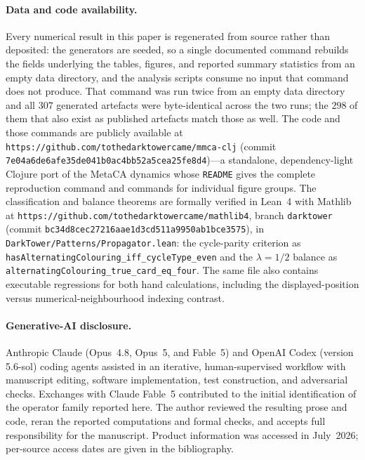 \documentclass[man,12pt,floatsintext,donotrepeattitle]{apa7}
\begin{document}
\paragraph{Data and code availability.} Every numerical result in this paper is
regenerated from source rather than deposited: the generators are seeded, so a
single documented command rebuilds the fields underlying the tables, figures,
and reported summary statistics from an empty data directory, and the analysis
scripts consume no input that command does not produce. That command was run
twice from an empty data directory and all $307$ generated artefacts were
byte-identical across the two runs; the $298$ of them that also exist as
published artefacts match those as well. The code and those
commands are publicly available at
\texttt{https://github.com/tothedarktowercame/mmca-clj} (commit
\texttt{7e04a6de6afe35de041b0ac4bb52a5cea25fe8d4})---a standalone,
dependency-light Clojure port of the MetaCA dynamics whose \texttt{README} gives
the complete reproduction command and commands for individual figure groups.
The classification and balance theorems are
formally verified in Lean~4 with Mathlib at
\texttt{https://github.com/tothedarktowercame/mathlib4}, branch \texttt{darktower}
(commit \texttt{bc34d8cec27216aae1d3cd511a9950ab1bce3575}), in
\texttt{DarkTower/Patterns/Propagator.lean}: the cycle-parity criterion as
\texttt{hasAlternatingColouring\_iff\_cycleType\_even} and the $\lambda = 1/2$
balance as \texttt{alternatingColouring\_true\_card\_eq\_four}. The same file
also contains executable regressions for both hand calculations, including the
displayed-position versus numerical-neighbourhood indexing contrast.

\paragraph{Generative-AI disclosure.} Anthropic Claude (Opus~4.8, Opus~5, and
Fable~5) and OpenAI Codex (version 5.6-sol) coding agents
\parencite{anthropic_claude,anthropic_fable,openai_codex} assisted in an
iterative, human-supervised workflow with manuscript editing, software
implementation, test construction, and adversarial checks. Exchanges with
Claude Fable~5 contributed to the initial identification of the operator family
reported here. The author reviewed the resulting prose and code, reran the
reported computations and formal checks, and accepts full responsibility for
the manuscript. Product information was accessed in July~2026; per-source
access dates are given in the bibliography.

\printbibliography
\end{document}
